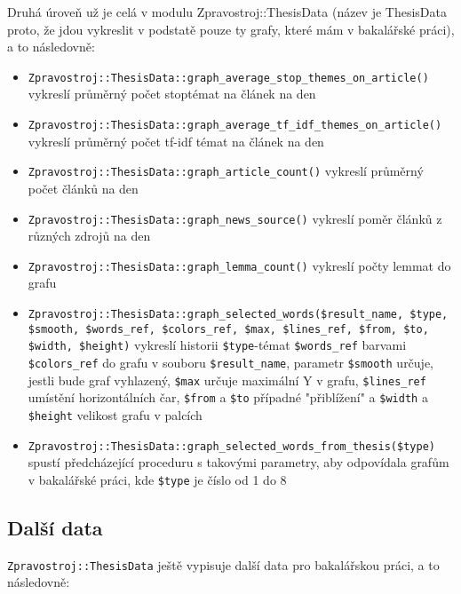 \documentclass[12pt,a4paper]{report}
\begin{document}
Druhá úroveň už je celá v modulu Zpravostroj::ThesisData (název je ThesisData proto, že jdou vykreslit v podstatě pouze ty grafy, které mám v bakalářské práci), a to následovně:
\begin{itemize}
	\item \texttt{Zpravostroj::ThesisData::graph\_average\_stop\_themes\_on\_article()} vykreslí průměrný počet stoptémat na článek na den
	\item \texttt{Zpravostroj::ThesisData::graph\_average\_tf\_idf\_themes\_on\_article()} vykreslí průměrný počet tf-idf témat na článek na den
	\item \texttt{Zpravostroj::ThesisData::graph\_article\_count()} vykreslí průměrný počet článků na den
	\item \texttt{Zpravostroj::ThesisData::graph\_news\_source()} vykreslí poměr článků z různých zdrojů na den
	\item \texttt{Zpravostroj::ThesisData::graph\_lemma\_count()} vykreslí počty lemmat do grafu
	\item \texttt{Zpravostroj::ThesisData::graph\_selected\_words(\$result\_name, \$type, \$smooth, \$words\_ref, \$colors\_ref, \$max, \$lines\_ref, \$from, \$to, \$width, \$height)} vykreslí historii \texttt{\$type}-témat \texttt{\$words\_ref} barvami \texttt{\$colors\_ref} do grafu v souboru \texttt{\$result\_name}, parametr \texttt{\$smooth} určuje, jestli bude graf vyhlazený, \texttt{\$max} určuje maximální Y v grafu, \texttt{\$lines\_ref} umístění horizontálních čar, \texttt{\$from} a \texttt{\$to} případné "přiblížení" a \texttt{\$width} a \texttt{\$height} velikost grafu v palcích
	\item \texttt{Zpravostroj::ThesisData::graph\_selected\_words\_from\_thesis(\$type)} spustí předcházející proceduru s takovými parametry, aby odpovídala grafům v bakalářské práci, kde \texttt{\$type} je číslo od 1 do 8
\end{itemize}
		
\subsection{Další data}
\texttt{Zpravostroj::ThesisData} ještě vypisuje další data pro bakalářskou práci, a to následovně:
\end{document}
